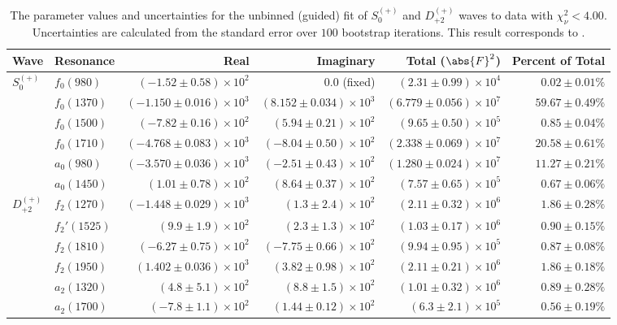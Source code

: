 \begin{table}[ht]
    \begin{center}
        \begin{tabular}{llrrrr}\toprule
        Wave & Resonance & Real & Imaginary & Total ($\abs{F}^2$) & Percent of Total \\\midrule
$S_{0}^{(+)}$ & $f_{0}(980)$ & $(-1.52 \pm 0.58) \times 10^{2}$ & $0.0$ (fixed) & $(2.31 \pm 0.99) \times 10^{4}$ & $0.02 \pm 0.01 \%$ \\
 & $f_{0}(1370)$ & $(-1.150 \pm 0.016) \times 10^{3}$ & $(8.152 \pm 0.034) \times 10^{3}$ & $(6.779 \pm 0.056) \times 10^{7}$ & $59.67 \pm 0.49 \%$ \\
 & $f_{0}(1500)$ & $(-7.82 \pm 0.16) \times 10^{2}$ & $(5.94 \pm 0.21) \times 10^{2}$ & $(9.65 \pm 0.50) \times 10^{5}$ & $0.85 \pm 0.04 \%$ \\
 & $f_{0}(1710)$ & $(-4.768 \pm 0.083) \times 10^{3}$ & $(-8.04 \pm 0.50) \times 10^{2}$ & $(2.338 \pm 0.069) \times 10^{7}$ & $20.58 \pm 0.61 \%$ \\
 & $a_{0}(980)$ & $(-3.570 \pm 0.036) \times 10^{3}$ & $(-2.51 \pm 0.43) \times 10^{2}$ & $(1.280 \pm 0.024) \times 10^{7}$ & $11.27 \pm 0.21 \%$ \\
 & $a_{0}(1450)$ & $(1.01 \pm 0.78) \times 10^{2}$ & $(8.64 \pm 0.37) \times 10^{2}$ & $(7.57 \pm 0.65) \times 10^{5}$ & $0.67 \pm 0.06 \%$ \\
$D_{+2}^{(+)}$ & $f_{2}(1270)$ & $(-1.448 \pm 0.029) \times 10^{3}$ & $(1.3 \pm 2.4) \times 10^{2}$ & $(2.11 \pm 0.32) \times 10^{6}$ & $1.86 \pm 0.28 \%$ \\
 & $f_{2}'(1525)$ & $(9.9 \pm 1.9) \times 10^{2}$ & $(2.3 \pm 1.3) \times 10^{2}$ & $(1.03 \pm 0.17) \times 10^{6}$ & $0.90 \pm 0.15 \%$ \\
 & $f_{2}(1810)$ & $(-6.27 \pm 0.75) \times 10^{2}$ & $(-7.75 \pm 0.66) \times 10^{2}$ & $(9.94 \pm 0.95) \times 10^{5}$ & $0.87 \pm 0.08 \%$ \\
 & $f_{2}(1950)$ & $(1.402 \pm 0.036) \times 10^{3}$ & $(3.82 \pm 0.98) \times 10^{2}$ & $(2.11 \pm 0.21) \times 10^{6}$ & $1.86 \pm 0.18 \%$ \\
 & $a_{2}(1320)$ & $(4.8 \pm 5.1) \times 10^{2}$ & $(8.8 \pm 1.5) \times 10^{2}$ & $(1.01 \pm 0.32) \times 10^{6}$ & $0.89 \pm 0.28 \%$ \\
 & $a_{2}(1700)$ & $(-7.8 \pm 1.1) \times 10^{2}$ & $(1.44 \pm 0.12) \times 10^{2}$ & $(6.3 \pm 2.1) \times 10^{5}$ & $0.56 \pm 0.19 \%$ \\\bottomrule
        \end{tabular}
    \caption{The parameter values and uncertainties for the unbinned (guided) fit of $S_{0}^{(+)}$ and $D_{+2}^{(+)}$ waves to data with $\chi^2_\nu < 4.00$. Uncertainties are calculated from the standard error over $100$ bootstrap iterations. This result corresponds to .}\label{tab:unbinned-fit-chisqdof-4.0-guided-Sp0p-Dp2p}
    \end{center}
\end{table}
